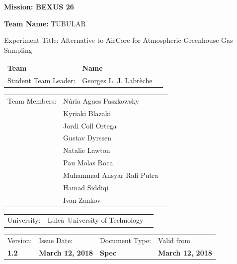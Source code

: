 \documentclass[a4paper,12pt,twoside]{article}
\begin{document}
\begin{flushleft}
\vspace{5pt}

\noindent \textbf{\hspace{-1pt}Mission: BEXUS 26} \\

\vspace{20pt}

{\hspace{-2pt}\noindent \Large{\textbf{Team Name:} } TUBULAR} \\

\vspace{20pt}

\hspace{-1pt}Experiment Title: Alternative to AirCore for Atmospheric Greenhouse Gas Sampling\\

\vspace{20pt}
\begin{tabular}{p{} p{} p{}}
\textbf{Team} & \textbf{Name}  \\
Student Team Leader:  &  Georges L. J. Labr\`{e}che \\
\end{tabular}
\vspace{5pt}
\begin{tabular}{p{} p{} p{}}
Team Members:  & N\'{u}ria Agues Paszkowsky \\
& Kyriaki Blazaki \\
& Jordi Coll Ortega \\
& Gustav Dyrssen \\
& Natalie Lawton \\
& Pau Molas Roca \\
& Muhammad Ansyar Rafi Putra \\
& Hamad Siddiqi \\
& Ivan Zankov \\
\end{tabular}
\begin{tabular}{p{} p{} p{}}
University: & Lule\aa \ University of Technology
\end{tabular}

\vspace{0.5cm} 


 \begin{tabular}{p{} p{} p{} p{}}
\footnotesize{Version:}     & \footnotesize{Issue Date:} & \footnotesize{Document Type:} & \footnotesize{Valid from} \\
\textbf{1.2}          & \textbf{March 12, 2018}    & \textbf{Spec}   & \textbf{March 12, 2018} \\ 
\end{tabular}


\end{flushleft}
\end{document}
